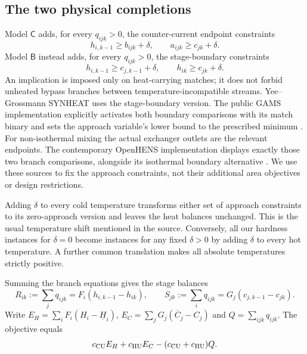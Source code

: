 \documentclass[11pt,a4paper]{report}
\newcommand{\CC}{\mathsf{C}}
\newcommand{\BB}{\mathsf{B}}
\begin{document}
\subsection{The two physical completions}
Model $\CC$ adds, for every $q_{ijk}>0$, the counter-current endpoint constraints
\begin{equation}\label{eq:C}
 h_{i,k-1}\geq b_{ijk}+\delta,\qquad
 a_{ijk}\geq c_{jk}+\delta.
\end{equation}
Model $\BB$ instead adds, for every $q_{ijk}>0$, the stage-boundary constraints
\begin{equation}\label{eq:B}
 h_{i,k-1}\geq c_{j,k-1}+\delta,\qquad
 h_{ik}\geq c_{jk}+\delta.
\end{equation}
An implication is imposed only on heat-carrying matches; it does not forbid
unheated bypass branches between temperature-incompatible streams.
Yee--Grossmann SYNHEAT uses the stage-boundary version. The public GAMS
implementation explicitly activates both boundary comparisons with its match
binary and sets the approach variable's lower bound to the prescribed minimum
\autocite{Yee1990,GAMS}. For non-isothermal mixing the actual exchanger outlets
are the relevant endpoints. The contemporary OpenHENS implementation displays
exactly those two branch comparisons, alongside its isothermal boundary
alternative \autocite{OpenHENS}. We use these sources to fix the approach
constraints, not their additional area objectives or design restrictions.

Adding $\delta$ to every cold temperature transforms either set of approach
constraints to its zero-approach version and leaves the heat balances
unchanged. This is the usual temperature shift mentioned in the source.
Conversely, all our hardness instances for $\delta=0$ become instances for any
fixed $\delta>0$ by adding $\delta$ to every hot temperature. A further common
translation makes all absolute temperatures strictly positive.

Summing the branch equations gives the stage balances
\begin{equation}\label{eq:stage}
 R_{ik}:=\sum_jq_{ijk}=F_i(h_{i,k-1}-h_{ik}),\qquad
 S_{jk}:=\sum_iq_{ijk}=G_j(c_{j,k-1}-c_{jk}).
\end{equation}
Write $E_H=\sum_iF_i(H_i-\underline H_i)$,
$E_C=\sum_jG_j(\overline C_j-C_j)$ and $Q=\sum_{ijk}q_{ijk}$.
The objective equals
\begin{equation}\label{eq:Qobj}
 c_{\rm CU}E_H+c_{\rm HU}E_C-(c_{\rm CU}+c_{\rm HU})Q.
\end{equation}
\end{document}
